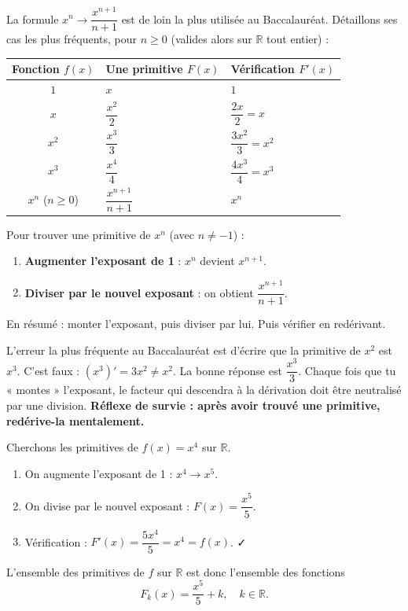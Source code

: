 \documentclass[11pt]{article}
\newcommand{\cle}[1]{{\popxbold\color{popdark}#1}}
\begin{document}
La formule $x^n \to \dfrac{x^{n+1}}{n+1}$ est de loin la plus utilisée au Baccalauréat. Détaillons ses cas les plus fréquents, pour $n \geq 0$ (valides alors sur $\mathbb{R}$ tout entier) :

\begin{center}
\begin{tabularx}{\linewidth}{|c|X|X|}
\hline
\rowcolor{popblueL} \textbf{Fonction $f(x)$} & \textbf{Une primitive $F(x)$} & \textbf{Vérification $F'(x)$} \\
\hline
$1$ & $x$ & $1$ \\
\hline
$x$ & $\dfrac{x^2}{2}$ & $\dfrac{2x}{2} = x$ \\
\hline
$x^2$ & $\dfrac{x^3}{3}$ & $\dfrac{3x^2}{3} = x^2$ \\
\hline
$x^3$ & $\dfrac{x^4}{4}$ & $\dfrac{4x^3}{4} = x^3$ \\
\hline
$x^n$ ($n \geq 0$) & $\dfrac{x^{n+1}}{n+1}$ & $x^n$ \\
\hline
\end{tabularx}
\end{center}

\begin{methode}
Pour trouver une primitive de $x^n$ (avec $n \neq -1$) :
\begin{enumerate}
\item \textbf{Augmenter l'exposant de 1} : $x^n$ devient $x^{n+1}$.
\item \textbf{Diviser par le nouvel exposant} : on obtient $\dfrac{x^{n+1}}{n+1}$.
\end{enumerate}
En résumé : \cle{monter l'exposant, puis diviser par lui}. Puis vérifier en redérivant.
\end{methode}

\begin{attention}
L'erreur la plus fréquente au Baccalauréat est d'écrire que la primitive de $x^2$ est $x^3$. C'est faux : $(x^3)' = 3x^2 \neq x^2$. La bonne réponse est $\dfrac{x^3}{3}$. Chaque fois que tu « montes » l'exposant, le facteur qui descendra à la dérivation doit être neutralisé par une division. \textbf{Réflexe de survie : après avoir trouvé une primitive, redérive-la mentalement.}
\end{attention}

\begin{exemplebox}[Primitive de $f(x) = x^4$]
Cherchons les primitives de $f(x) = x^4$ sur $\mathbb{R}$.
\begin{enumerate}
\item On augmente l'exposant de 1 : $x^4 \to x^5$.
\item On divise par le nouvel exposant : $F(x) = \dfrac{x^5}{5}$.
\item Vérification : $F'(x) = \dfrac{5x^4}{5} = x^4 = f(x)$. ✓
\end{enumerate}
L'ensemble des primitives de $f$ sur $\mathbb{R}$ est donc l'ensemble des fonctions
\[ F_k(x) = \frac{x^5}{5} + k, \quad k \in \mathbb{R}. \]
\end{exemplebox}
\end{document}
